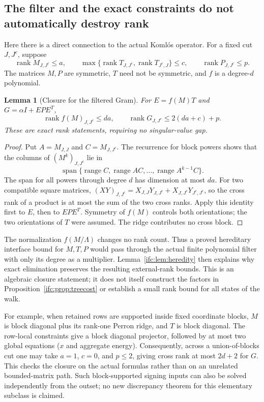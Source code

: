 \documentclass[11pt]{amsart}
\newtheorem{lemma}[theorem]{Lemma}
\theoremstyle{definition}\newtheorem{definition}[theorem]{Definition}
\theoremstyle{remark}\newtheorem{remark}[theorem]{Remark}
\numberwithin{equation}{section}
\newcommand{\rank}{\operatorname{rank}}
\begin{document}
\subsection{The filter and the exact constraints do not automatically destroy rank}
Here there is a direct connection to the actual Koml\'os operator.
For a fixed cut $J,J^c$, suppose
\[
 \rank M_{J,J^c}\le a,\qquad
 \max\{\rank T_{J,J^c},\rank T_{J^c,J}\}\le c,
 \qquad \rank P_{J,J^c}\le p.
\]
The matrices $M,P$ are symmetric, $T$ need not be symmetric, and
$f$ is a degree-$d$ polynomial.
\begin{lemma}[Closure for the filtered Gram]\label{ifc:lem:filtertree}
For $E=f(M)T$ and $G=\alpha I+EPE^T$,
\begin{equation}\label{ifc:eq:filtertree}
 \rank f(M)_{J,J^c}\le da,\qquad
 \rank G_{J,J^c}\le2(da+c)+p.
\end{equation}
These are exact rank statements, requiring no singular-value gap.
\end{lemma}
\begin{proof}
Put $A=M_{J,J}$ and $C=M_{J,J^c}$. The recurrence for block powers
shows that the columns of $(M^k)_{J,J^c}$ lie in
\[
 \operatorname{span}\{\operatorname{range}C,
                 \operatorname{range}AC,\ldots,
                 \operatorname{range}A^{k-1}C\}.
\]
The span for all powers through degree $d$ has dimension at most $da$.
For two compatible square matrices,
$(XY)_{J,J^c}=X_{J,J}Y_{J,J^c}+X_{J,J^c}Y_{J^c,J^c}$, so the
cross rank of a product is at most the sum of the two cross ranks.
Apply this identity first to $E$, then to $EPE^T$. Symmetry of $f(M)$
controls both orientations; the two orientations of $T$ were assumed.
The ridge contributes no cross block.
\end{proof}
The normalization $f(M/\Lambda)$ changes no rank count. Thus a proved
hereditary interface bound for $M,T,P$ would pass through the actual
finite polynomial filter with only its degree as a multiplier.
Lemma~\ref{ifc:lem:heredity} then explains why exact elimination preserves
the resulting external-rank bounds. This is an algebraic closure
statement; it does not itself construct the factors in
Proposition~\ref{ifc:prop:treecost} or establish a small rank bound for all
states of the walk.

For example, when retained rows are supported inside fixed coordinate
blocks, $M$ is block diagonal plus its rank-one Perron ridge, and $T$
is block diagonal. The row-local constraints give a block diagonal
projector, followed by at most two global equations ($x$ and aggregate
energy). Consequently, across a union-of-blocks cut one may take
$a=1$, $c=0$, and $p\le2$, giving cross rank at most $2d+2$ for $G$.
This checks the closure on the actual formulas rather than on an
unrelated bounded-matrix path. Such block-supported signing inputs
can also be solved independently from the outset; no new discrepancy
theorem for this elementary subclass is claimed.
\end{document}
